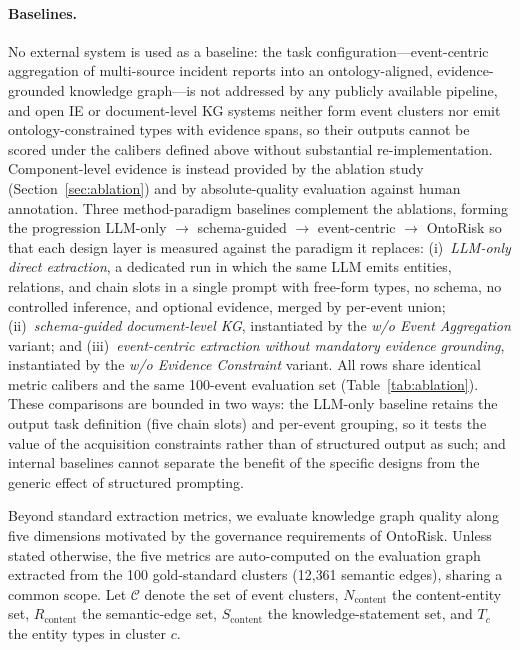\documentclass[a4paper,fleqn]{cas-dc}
\begin{document}
\paragraph{Baselines.}
No external system is used as a baseline: the task
configuration---event-centric aggregation of multi-source incident
reports into an ontology-aligned, evidence-grounded knowledge
graph---is not addressed by any publicly available pipeline, and open
IE or document-level KG systems neither form event clusters nor emit
ontology-constrained types with evidence spans, so their outputs
cannot be scored under the calibers defined above without substantial
re-implementation.
Component-level evidence is instead provided by the ablation study
(Section~\ref{sec:ablation}) and by absolute-quality evaluation
against human annotation.
Three method-paradigm baselines complement the ablations, forming the
progression LLM-only $\to$ schema-guided $\to$ event-centric $\to$
OntoRisk so that each design layer is measured against the paradigm
it replaces:
(i)~\emph{LLM-only direct extraction}, a dedicated run in which the
same LLM emits entities, relations, and chain slots in a single
prompt with free-form types, no schema, no controlled inference, and
optional evidence, merged by per-event union;
(ii)~\emph{schema-guided document-level KG}, instantiated by the
\emph{w/o Event Aggregation} variant; and
(iii)~\emph{event-centric extraction without mandatory evidence
grounding}, instantiated by the \emph{w/o Evidence Constraint}
variant.
All rows share identical metric calibers and the same 100-event
evaluation set (Table~\ref{tab:ablation}).
These comparisons are bounded in two ways: the LLM-only baseline retains
the output task definition (five chain slots) and per-event grouping,
so it tests the value of the acquisition constraints rather than of
structured output as such; and internal baselines cannot separate the
benefit of the specific designs from the generic effect of structured
prompting.

Beyond standard extraction metrics, we evaluate knowledge graph
quality along five dimensions motivated by the governance requirements
of OntoRisk. Unless stated otherwise, the five metrics are
auto-computed on the evaluation graph extracted from the 100
gold-standard clusters (12{,}361 semantic edges), sharing a common
scope. Let $\mathcal{C}$ denote the set of event clusters,
$N_{\text{content}}$ the content-entity set, $R_{\text{content}}$
the semantic-edge set, $S_{\text{content}}$ the knowledge-statement
set, and $T_c$ the entity types in cluster $c$.
\end{document}
